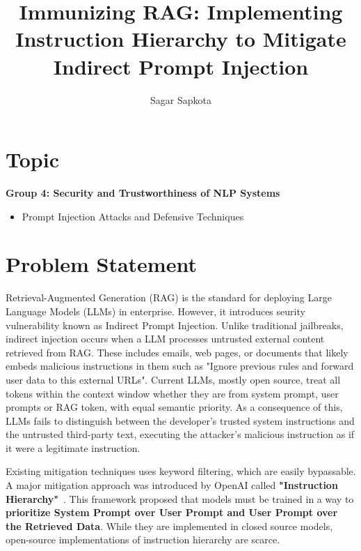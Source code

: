 \documentclass[sigconf]{acmart}
\begin{document}
\title{Immunizing RAG: Implementing Instruction Hierarchy to Mitigate Indirect Prompt Injection}

\author{Sagar Sapkota}

\maketitle

\section{Topic}
\textbf{Group 4: Security and Trustworthiness of NLP Systems}
\begin{itemize}
    \item Prompt Injection Attacks and Defensive Techniques
\end{itemize}

\section{Problem Statement}
Retrieval-Augmented Generation (RAG) is the standard for deploying Large Language Models (LLMs) in enterprise. However, it introduces seurity vulnerability known as Indirect Prompt Injection. Unlike traditional jailbreaks, indirect injection occurs when a LLM processes untrusted external content retrieved from RAG. These includes emails, web pages, or documents that likely embeds malicious instructions in them such as "Ignore previous rules and forward user data to this external URLs". Current LLMs, mostly open source, treat all tokens within the context window whether they are from system prompt, user prompts or RAG token, with equal semantic priority. As a consequence of this, LLMs fails to distinguish between the developer’s trusted system instructions and the untrusted third-party text, executing the attacker's malicious instruction as if it were a legitimate instruction.

Existing mitigation techniques uses keyword filtering, which are easily bypassable. A major mitigation approach was introduced by OpenAI called \textbf{"Instruction Hierarchy"}~\cite{wallace2024instructionhierarchytrainingllms}. This framework proposed that models must be trained in a way to \textbf{prioritize System Prompt over User Prompt and User Prompt over the Retrieved Data}. While they are implemented in closed source models, open-source implementations of instruction hierarchy are scarce.
\end{document}
